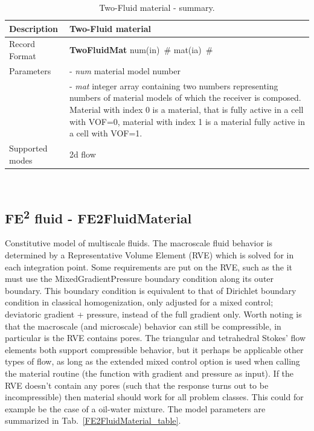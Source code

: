 \documentclass[a4paper]{article}
\newcommand{\descitem}[1]{{\noindent \bf #1}}
\newcommand{\elemparam}[2]{{{#1\tiny (#2)}~\#}}
\newcommand{\param}[1]{{\it #1}}
\newenvironment{mmt}{\begin{tabular}{|l|p{9cm}|}}{\end{tabular}\\}
\newenvironment{mmt}{\begin{tabular}{|l|l|}}{\end{tabular}\\}
\begin{document}
\begin{table}[!htb]
\begin{mmt}
\hline
Description & Two-Fluid material\\
\hline
Record Format & \descitem{TwoFluidMat} \elemparam{num}{in}
\elemparam{mat}{ia}\\
Parameters &- \param{num} material model number\\
&- \param{mat} integer array containing two numbers representing
numbers of material models of which the receiver is composed. Material
with index 0 is a material, that is fully active in a cell with VOF=0,
material with index 1 is a material fully active in a cell with VOF=1.\\
Supported modes& 2d flow\\
\hline
\end{mmt}
\caption{Two-Fluid material - summary.}
\label{TwoFluidMaterial_table}
\end{table}

\subsection{FE\textsuperscript{2} fluid - FE2FluidMaterial}
\label{FE2FluidMaterial}
Constitutive model of multiscale fluids.
The macroscale fluid behavior is determined by a Representative Volume Element (RVE) which is solved for in each integration point.
Some requirements are put on the RVE, such as the it must use the MixedGradientPressure boundary condition along its outer boundary. This boundary condition is equivalent to that of Dirichlet boundary condition in classical homogenization, only adjusted for a mixed control; deviatoric gradient + pressure, instead of the full gradient only.
Worth noting is that the macroscale (and microscale) behavior can still be compressible,  in particular is the RVE contains pores.
The triangular and tetrahedral Stokes' flow elements both support compressible behavior, but it perhaps be applicable other types of flow, as long as the extended mixed control option is used when calling the material routine (the function with gradient and pressure as input). If the RVE doesn't contain any pores (such that the response turns out to be incompressible) then material should work for all problem classes.
This could for example be the case of a oil-water mixture.
The model parameters are summarized in Tab.~\ref{FE2FluidMaterial_table}.
\end{document}
